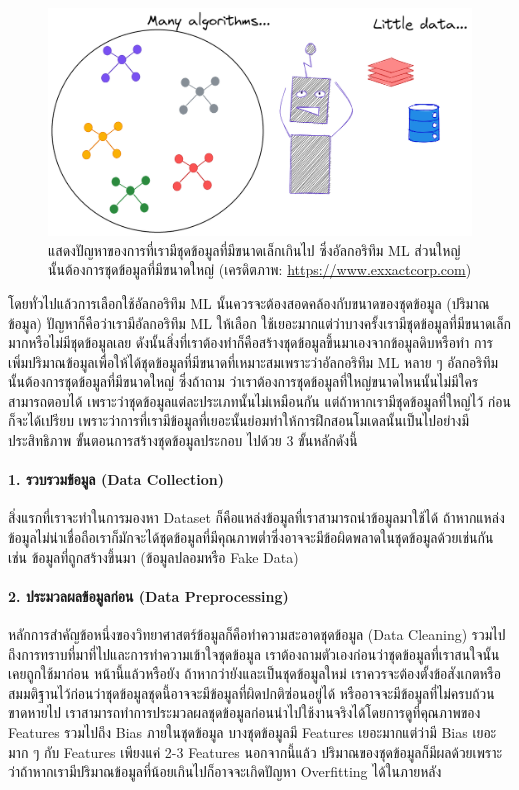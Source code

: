 \begin{figure}[htbp]
    \centering
    \includegraphics[width=0.8\linewidth]{fig/many_ml_little_dataset.png}
    \caption{แสดงปัญหาของการที่เรามีชุดข้อมูลที่มีขนาดเล็กเกินไป ซึ่งอัลกอริทึม ML ส่วนใหญ่นั้นต้องการชุดข้อมูลที่มีขนาดใหญ่ 
    (เครดิตภาพ: \url{https://www.exxactcorp.com})}
    \label{fig:many_ml_little_dataset}
\end{figure}

โดยทั่วไปแล้วการเลือกใช้อัลกอริทึม ML นั้นควรจะต้องสอดคล้องกับขนาดของชุดข้อมูล (ปริมาณข้อมูล) ปัญหาก็คือว่าเรามีอัลกอริทึม ML ให้เลือก%
ใช้เยอะมากแต่ว่าบางครั้งเรามีชุดข้อมูลที่มีขนาดเล็กมากหรือไม่มีชุดข้อมูลเลย ดังนั้นสิ่งที่เราต้องทำก็คือสร้างชุดข้อมูลขึ้นมาเองจากข้อมูลดิบหรือทำ%
การเพิ่มปริมาณข้อมูลเพื่อให้ได้ชุดข้อมูลที่มีขนาดที่เหมาะสมเพราะว่าอัลกอริทึม ML หลาย ๆ อัลกอริทึมนั้นต้องการชุดข้อมูลที่มีขนาดใหญ่ ซึ่งถ้าถาม%
ว่าเราต้องการชุดข้อมูลที่ใหญ่ขนาดไหนนั้นไม่มีใครสามารถตอบได้ เพราะว่าชุดข้อมูลแต่ละประเภทนั้นไม่เหมือนกัน แต่ถ้าหากเรามีชุดข้อมูลที่ใหญ่ไว้%
ก่อนก็จะได้เปรียบ เพราะว่าการที่เรามีข้อมูลที่เยอะนั้นย่อมทำให้การฝึกสอนโมเดลนั้นเป็นไปอย่างมีประสิทธิภาพ ขั้นตอนการสร้างชุดข้อมูลประกอบ%
ไปด้วย 3 ขั้นหลักดังนี้

\paragraph{1. รวบรวมข้อมูล (Data Collection)} สิ่งแรกที่เราจะทำในการมองหา Dataset ก็คือแหล่งข้อมูลที่เราสามารถนำข้อมูลมาใช้ได้ 
ถ้าหากแหล่งข้อมูลไม่น่าเชื่อถือเราก็มักจะได้ชุดข้อมูลที่มีคุณภาพต่ำซึ่งอาจจะมีข้อผิดพลาดในชุดข้อมูลด้วยเช่นกัน เช่น ข้อมูลที่ถูกสร้างขึ้นมา 
(ข้อมูลปลอมหรือ Fake Data) 

\paragraph{2. ประมวลผลข้อมูลก่อน (Data Preprocessing)} หลักการสำคัญข้อหนึ่งของวิทยาศาสตร์ข้อมูลก็คือทำความสะอาดชุดข้อมูล 
(Data Cleaning) รวมไปถึงการทราบที่มาที่ไปและการทำความเข้าใจชุดข้อมูล เราต้องถามตัวเองก่อนว่าชุดข้อมูลที่เราสนใจนั้นเคยถูกใช้มาก่อน%
หน้านี้แล้วหรือยัง ถ้าหากว่ายังและเป็นชุดข้อมูลใหม่ เราควรจะต้องตั้งข้อสังเกตหรือสมมติฐานไว้ก่อนว่าชุดข้อมูลชุดนี้อาจจะมีข้อมูลที่ผิดปกติซ่อนอยู่ได้ 
หรืออาจจะมีข้อมูลที่ไม่ครบถ้วนขาดหายไป เราสามารถทำการประมวลผลชุดข้อมูลก่อนนำไปใช้งานจริงได้โดยการดูที่คุณภาพของ Features รวมไปถึง 
Bias ภายในชุดข้อมูล บางชุดข้อมูลมี Features เยอะมากแต่ว่ามี Bias เยอะมาก ๆ กับ Features เพียงแค่ 2-3 Features นอกจากนี้แล้ว%
ปริมาณของชุดข้อมูลก็มีผลด้วยเพราะว่าถ้าหากเรามีปริมาณข้อมูลที่น้อยเกินไปก็อาจจะเกิดปัญหา Overfitting ได้ในภายหลัง

